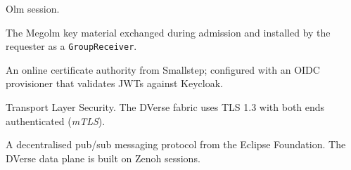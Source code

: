 \documentclass[11pt,a4paper]{article}
\begin{document}
\begin{description}[leftmargin=2.6cm, style=nextline, font=\sffamily\bfseries]
        Olm session.
  \item[\texttt{SessionKey}] The Megolm key material
        exchanged during admission and installed by the
        requester as a \texttt{GroupReceiver}.
  \item[Step-CA] An online certificate authority from
        Smallstep; configured with an OIDC provisioner that
        validates JWTs against Keycloak.
  \item[TLS] Transport Layer Security. The DVerse fabric
        uses TLS 1.3 with both ends authenticated
        (\emph{mTLS}).
  \item[Zenoh] A decentralised pub/sub messaging protocol
        from the Eclipse Foundation. The DVerse data plane
        is built on Zenoh sessions.
\end{description}
\end{document}
